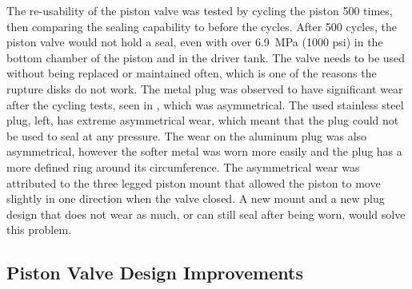 The re-usability of the piston valve was tested by cycling the piston 500 times, then comparing the sealing capability to before the cycles. After 500 cycles, the piston valve would not hold a seal, even with over \SI{6.9}{\mega\pascal} (1000 psi) in the bottom chamber of the piston and in the driver tank. The valve needs to be used without being replaced or maintained often, which is one of the reasons the rupture disks do not work. The metal plug was observed to have significant wear after the cycling tests, seen in , which was asymmetrical. The used stainless steel plug, left, has extreme asymmetrical wear, which meant that the plug could not be used to seal at any pressure. The wear on the aluminum plug was also asymmetrical, however the softer metal was worn more easily and the plug has a more defined ring around its circumference. The asymmetrical wear was attributed to the three legged piston mount that allowed the piston to move slightly in one direction when the valve closed. A new mount and a new plug design that does not wear as much, or can still seal after being worn, would solve this problem.



\subsection{Piston Valve Design Improvements} \label{ss:new valve}

